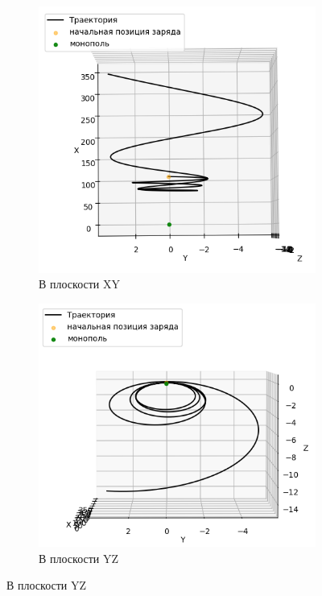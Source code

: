 \documentclass[a4paper, 12pt]{article}
\begin{document}
\begin{figure}[h]
    \centering
    \begin{subfigure}{0.4\textwidth}
        \centering
        \includegraphics[width=0.8\linewidth]{simulation1.png}
        \caption{В плоскости XY}  
    \end{subfigure}

    \begin{subfigure}{0.4\textwidth}
        \centering
        \includegraphics[width=0.8\linewidth]{simulation2.png}
        \caption{В плоскости YZ}  
    \end{subfigure}



\end{figure}
\end{document}
